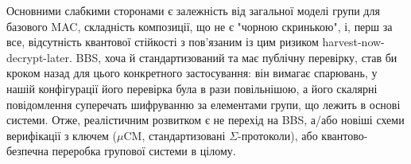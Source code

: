 Основними слабкими сторонами є залежність від загальної моделі групи для базового MAC, складність композиції, що 
не є "чорною скринькою"{}, і, перш за все, відсутність квантової стійкості з пов'язаним із цим ризиком 
harvest-now-decrypt-later. BBS, хоча й стандартизований та має публічну перевірку, став би кроком назад для цього 
конкретного застосування: він вимагає спарювань, у нашій конфігурації його перевірка була в рази повільнішою, а 
його скалярні повідомлення суперечать шифруванню за елементами групи, що лежить в основі системи. Отже, реалістичним 
розвитком є не перехід на BBS, а/або новіші схеми верифікації з ключем ($\mu$CM, стандартизовані $\Sigma$-протоколи), 
або квантово-безпечна переробка групової системи в цілому.
